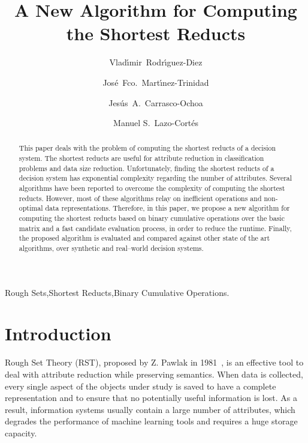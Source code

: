 \documentclass[authoryear,preprint,review,12pt]{elsarticle}
\begin{document}
	\title{A New Algorithm for Computing the Shortest Reducts}
	
	\author[inaoe,uc]{Vlad\'{\i}mir~Rodr\'{\i}guez-Diez}
	\author[inaoe]{Jos\'{e}~Fco.~Mart\'{\i}nez-Trinidad}
	\author[inaoe]{Jes\'{u}s~A.~Carrasco-Ochoa}	
	\author[inaoe]{Manuel S.~Lazo-Cort\'{e}s}
	\address[inaoe]{Computer Science Department\\
					Instituto Nacional de Astrof\'{\i}sica, \'{O}ptica y Electr\'{o}nica\\
					Luis Enrique Erro \# 1, Santa Mar\'{\i}a Tonantzintla, Puebla, 72840, M\'{e}xico} 
	\address[uc]{Electrical Engineering Department\\
				 Universidad de Camag\"{u}ey\\
				 Circv. Nte. km 5$\frac{1}{2}$, Camag\"{u}ey, Cuba}
	
	\begin{abstract}
		This paper deals with the problem of computing the shortest reducts of a decision system. The shortest reducts are useful for attribute reduction in classification problems and data size reduction. Unfortunately, finding the shortest reducts of a decision system has exponential complexity regarding the number of attributes. Several algorithms have been reported to overcome the complexity of computing the shortest reducts. However, most of these algorithms relay on inefficient operations and non-optimal data representations. Therefore, in this paper, we propose a new algorithm for computing the shortest reducts based on binary cumulative operations over the basic matrix and a fast candidate evaluation process, in order to reduce the runtime. Finally, the proposed algorithm is evaluated and compared against other state of the art algorithms, over synthetic and real--world decision systems.
	\end{abstract}
	
	\begin{keyword}
		Rough Sets\sep Shortest Reducts\sep Binary Cumulative Operations.
	\end{keyword}

	\maketitle


\section{Introduction}
  Rough Set Theory (RST), proposed by Z. Pawlak in 1981~\citep{Pawlak81,Pawlak81-2,Pawlak82,Pawlak91}, is an effective tool to deal with attribute reduction while preserving semantics. When data is collected, every single aspect of the objects under study is saved to have a complete representation and to ensure that no potentially useful information is lost. As a result, information systems usually contain a large number of attributes, which degrades the performance of machine learning tools and requires a huge storage capacity. 
  
\end{document}
